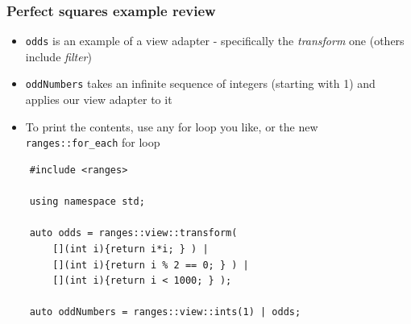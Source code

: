 \documentclass{beamer}
\begin{document}

\begin{frame}[fragile] %
\frametitle{Perfect squares example review}

\begin{itemize}
\item \texttt{odds} is an example of a view adapter - specifically the \textit{transform} one (others include \textit{filter})
\item \texttt{oddNumbers} takes an infinite sequence of integers (starting with 1) and applies our view adapter to it
\item To print the contents, use any for loop you like, or the new \texttt{ranges::for\_each} for loop 
\end{itemize}

\begin{lstlisting}
    #include <ranges>
    
    using namespace std;    
    
    auto odds = ranges::view::transform(
     	[](int i){return i*i; } ) |
     	[](int i){return i % 2 == 0; } ) |
     	[](int i){return i < 1000; } );
    									
    auto oddNumbers = ranges::view::ints(1) | odds;
\end{lstlisting}
\end{frame}
\end{document}
